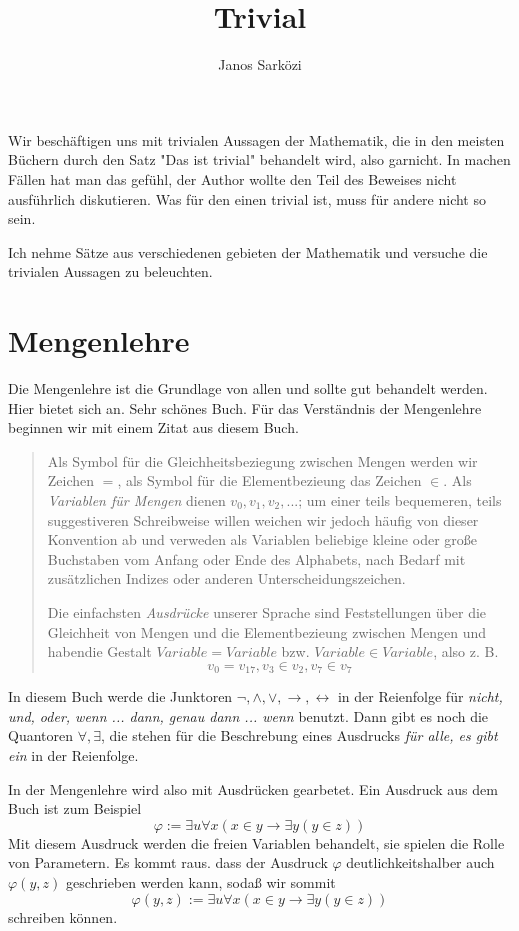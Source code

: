 \documentclass[11pt, a4paper]{article}
\title{Trivial}
\author{Janos Sarközi}
\begin{document}
\maketitle
\newpage
\tableofcontents
\newpage

Wir beschäftigen uns mit trivialen Aussagen der Mathematik, die in den meisten
Büchern durch den Satz "Das ist trivial" behandelt wird, also garnicht. In
machen Fällen hat man das gefühl, der Author wollte den Teil des Beweises
nicht ausführlich diskutieren. Was für den einen trivial ist, muss für andere
nicht so sein.

Ich nehme Sätze aus verschiedenen gebieten der Mathematik und versuche die
trivialen Aussagen zu beleuchten.

\newpage
\section{Mengenlehre} Die Mengenlehre ist die Grundlage von allen und sollte
gut behandelt werden.  Hier bietet sich \cite{Ebbinghaus2003} an. Sehr
schönes Buch. Für das Verständnis der Mengenlehre beginnen wir mit einem
Zitat aus diesem Buch.
\begin{quote}
    Als Symbol für die Gleichheitsbeziegung zwischen Mengen werden wir Zeichen
    $=$, als Symbol für die Elementbezieung das Zeichen $\in$. Als
    \textit{Variablen für Mengen} dienen $v_0, v_1, v_2, ...$; um einer teils
    bequemeren, teils suggestiveren Schreibweise willen weichen wir jedoch
    häufig von dieser Konvention ab und verweden als Variablen beliebige
    kleine oder große Buchstaben vom Anfang oder Ende des Alphabets, nach Bedarf
    mit zusätzlichen Indizes oder anderen Unterscheidungszeichen.

    Die einfachsten \textit{Ausdrücke} unserer Sprache sind Feststellungen
    über die Gleichheit von Mengen und die Elementbezieung zwischen Mengen und
    habendie Gestalt $Variable = Variable$ bzw. $Variable \in Variable$, also
    z. B.
    \[
        v_0 = v_{17}, v_3 \in v_2, v_7 \in v_7
    \]
\end{quote}
\noindent
In diesem Buch werde die Junktoren $\lnot, \land, \lor, \rightarrow,
\leftrightarrow$ in der Reienfolge für \textit{nicht, und, oder, wenn ...
dann, genau dann ... wenn} benutzt. Dann gibt es noch die Quantoren $\forall,
\exists$, die stehen für die Beschrebung eines Ausdrucks \textit{für alle, es
gibt ein} in der Reienfolge.
\newline

\noindent
In der Mengenlehre wird also mit Ausdrücken gearbetet. Ein Ausdruck aus dem
Buch ist zum Beispiel
\[
    \varphi := \exists u\forall x(x\in y \rightarrow \exists y(y\in z))
\]
Mit diesem Ausdruck werden die freien Variablen behandelt, sie spielen die
Rolle von Parametern. Es kommt raus. dass der Ausdruck $\varphi$
deutlichkeitshalber auch $\varphi(y, z)$ geschrieben werden kann, sodaß wir
sommit 
\[
    \varphi(y, z) := \exists u\forall x(x\in y \rightarrow \exists y(y\in z))
\]
schreiben können.
\newline
\end{document}
